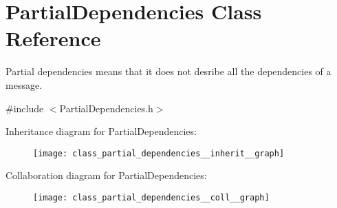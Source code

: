 \hypertarget{class_partial_dependencies}{}\section{Partial\+Dependencies Class Reference}
\label{class_partial_dependencies}


Partial dependencies means that it does not desribe all the dependencies of a message.  




{\ttfamily \#include $<$Partial\+Dependencies.\+h$>$}



Inheritance diagram for Partial\+Dependencies\+:\nopagebreak
\begin{figure}[H]
\begin{center}
\leavevmode
\texttt{[image: class\_partial\_dependencies\_\_inherit\_\_graph]}
\end{center}
\end{figure}


Collaboration diagram for Partial\+Dependencies\+:\nopagebreak
\begin{figure}[H]
\begin{center}
\leavevmode
\texttt{[image: class\_partial\_dependencies\_\_coll\_\_graph]}
\end{center}
\end{figure}
